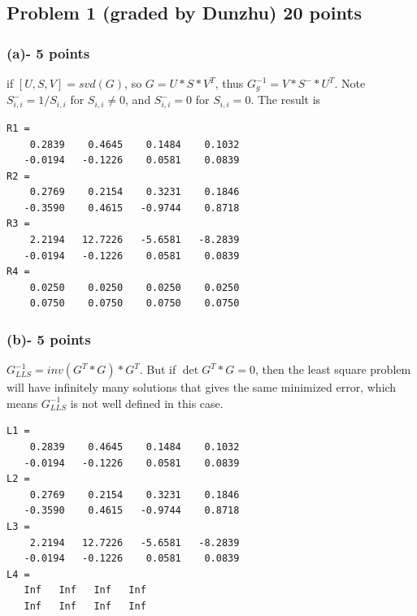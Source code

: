 \documentclass[11pt]{article}
\begin{document}
\lstset{language=Matlab,%
  breaklines=true,%
  morekeywords={matlab2tikz},
  keywordstyle=\color{blue},%
  morekeywords=[2]{1}, keywordstyle=[2]{\color{black}},
  identifierstyle=\color{black},%
  stringstyle=\color{mylilas},
  commentstyle=\color{mygreen},%
  showstringspaces=false,%
  numbers=left,%
  numberstyle={\tiny \color{black}},%
  numbersep=9pt, %
  emph=[1]{for,end,break},emphstyle=[1]\color{red}, %
}



\subsection*{Problem 1 (graded by Dunzhu) 20 points}

\subsubsection*{(a)- 5 points}
if $[U,S,V]=svd(G)$, so $G=U*S*V^{T}$, thus $G^{-1}_g=V*S^{-}*U^{T}$. Note $S^{-}_{i,i} = 1/S_{i,i}$ for $S_{i,i}\neq 0$, and $S^{-}_{i,i} =0 $ for $S_{i,i} = 0$. The result is
\begin{verbatim}
R1 =
    0.2839    0.4645    0.1484    0.1032
   -0.0194   -0.1226    0.0581    0.0839
R2 =
    0.2769    0.2154    0.3231    0.1846
   -0.3590    0.4615   -0.9744    0.8718
R3 =
    2.2194   12.7226   -5.6581   -8.2839
   -0.0194   -0.1226    0.0581    0.0839
R4 =
    0.0250    0.0250    0.0250    0.0250
    0.0750    0.0750    0.0750    0.0750
\end{verbatim}

\subsubsection*{(b)- 5 points}
$ G^{-1}_{LLS} = inv(G^{T}*G)*G^{T}$. But if $\det{G^{T}*G}=0$, then the least square problem will have infinitely many solutions that gives the same minimized error, which means $G^{-1}_{LLS}$ is not well defined in this case. 
\begin{verbatim}
L1 =
    0.2839    0.4645    0.1484    0.1032
   -0.0194   -0.1226    0.0581    0.0839
L2 =
    0.2769    0.2154    0.3231    0.1846
   -0.3590    0.4615   -0.9744    0.8718
L3 =
    2.2194   12.7226   -5.6581   -8.2839
   -0.0194   -0.1226    0.0581    0.0839
L4 =
   Inf   Inf   Inf   Inf
   Inf   Inf   Inf   Inf

\end{verbatim}

\end{document}
